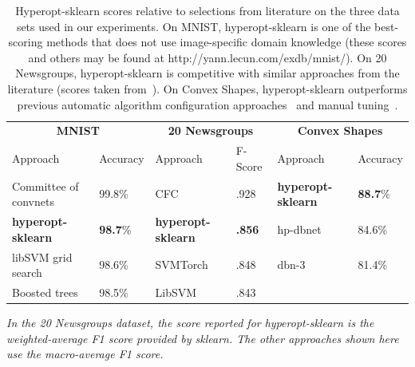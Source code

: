 \documentclass[wcp]{jmlr}
\begin{document}
\begin{table}
  \begin{threeparttable}
    \caption{
        Hyperopt-sklearn scores relative to selections from literature on the three data sets used in our experiments.
        On MNIST, hyperopt-sklearn is one of the best-scoring methods that does not use image-specific domain knowledge (these scores and others may be found at http://yann.lecun.com/exdb/mnist/).
	On 20 Newsgroups, hyperopt-sklearn is competitive with similar approaches from the literature (scores taken from~\citet{guan2009class}).
        On Convex Shapes, hyperopt-sklearn outperforms previous automatic algorithm configuration approaches~\citep{eggensperger+etal:2013} and manual tuning~\citep{larochelle+etal:2007}.
    }
    \label{tbl:acc}
    \centering
    \small
    \begin{tabular}{llllll}
        \hline
        \multicolumn{2}{c}{\textbf{MNIST}} & \multicolumn{2}{c}{\textbf{20 Newsgroups}} & \multicolumn{2}{c}{\textbf{Convex Shapes}}  \\
        Approach & Accuracy  & Approach & F-Score & Approach & Accuracy\\
        \hline
	Committee of convnets & 99.8\%                & CFC & .928 & \textbf{hyperopt-sklearn} & \textbf{88.7}\%\\
	\textbf{hyperopt-sklearn} & \textbf{98.7}\%   & \textbf{hyperopt-sklearn} & \textbf{.856} & hp-dbnet & 84.6\% \\
        libSVM grid search & 98.6\%                   & SVMTorch & .848 & dbn-3 & 81.4\%\\
        Boosted trees & 98.5\%                        & LibSVM & .843 &  &  \\
    \end{tabular}
    \begin{tablenotes}
      \footnotesize
      \item
	      \textit{In the 20 Newsgroups dataset, the score reported for hyperopt-sklearn is the weighted-average F1 score provided by sklearn. The other approaches shown here use the macro-average F1 score.} 
    \end{tablenotes}
  \end{threeparttable}
\end{table}
\end{document}
